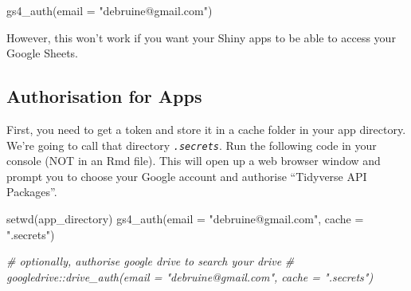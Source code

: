 \documentclass[
  oneside]{book}
\newenvironment{Shaded}{\begin{snugshade}}{\end{snugshade}}
\newcommand{\AttributeTok}[1]{\textcolor[rgb]{0.77,0.63,0.00}{#1}}
\newcommand{\CommentTok}[1]{\textcolor[rgb]{0.56,0.35,0.01}{\textit{#1}}}
\newcommand{\FunctionTok}[1]{\textcolor[rgb]{0.00,0.00,0.00}{#1}}
\newcommand{\NormalTok}[1]{#1}
\newcommand{\StringTok}[1]{\textcolor[rgb]{0.31,0.60,0.02}{#1}}
\begin{document}
\begin{Shaded}
\begin{Highlighting}[]
\FunctionTok{gs4\_auth}\NormalTok{(}\AttributeTok{email =} \StringTok{"debruine@gmail.com"}\NormalTok{)}
\end{Highlighting}
\end{Shaded}

However, this won't work if you want your Shiny apps to be able to access your Google Sheets.

\hypertarget{authorisation-for-apps}{%
\subsection{Authorisation for Apps}\label{authorisation-for-apps}}

First, you need to get a token and store it in a cache folder in your app directory. We're going to call that directory \textit{\texttt{.secrets}}. Run the following code in your console (NOT in an Rmd file). This will open up a web browser window and prompt you to choose your Google account and authorise ``Tidyverse API Packages''.

\begin{Shaded}
\begin{Highlighting}[]
\FunctionTok{setwd}\NormalTok{(app\_directory)}
\FunctionTok{gs4\_auth}\NormalTok{(}\AttributeTok{email =} \StringTok{"debruine@gmail.com"}\NormalTok{, }\AttributeTok{cache =} \StringTok{".secrets"}\NormalTok{)}

\CommentTok{\# optionally, authorise google drive to search your drive}
\CommentTok{\# googledrive::drive\_auth(email = "debruine@gmail.com", cache = ".secrets")}
\end{Highlighting}
\end{Shaded}
\end{document}
